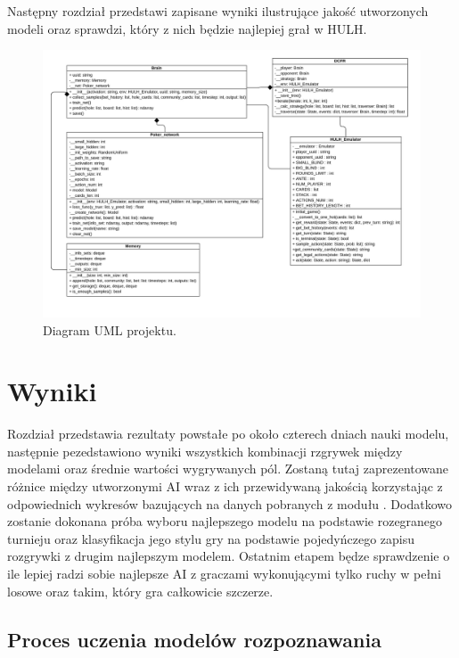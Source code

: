 \documentclass[12pt,oneside,a4paper]{report}
\begin{document}
Następny
rozdział przedstawi zapisane wyniki ilustrujące jakość utworzonych modeli oraz sprawdzi, który z
nich będzie najlepiej grał w HULH.



\begin{figure}[!ht]
  \centering
  \hspace*{-1cm}   
  \includegraphics[width=1.1\textwidth]{./img/uml.pdf}
  \caption{Diagram UML projektu.}
\end{figure}





\chapter{Wyniki}

Rozdział przedstawia rezultaty powstałe po około czterech dniach nauki modelu, następnie
pezedstawiono wyniki
wszystkich kombinacji rzgrywek między modelami oraz średnie wartości wygrywanych pól.
Zostaną tutaj zaprezentowane różnice między utworzonymi AI wraz z ich przewidywaną jakością
korzystając z odpowiednich wykresów bazujących na danych pobranych z modułu . 
Dodatkowo zostanie dokonana próba wyboru najlepszego modelu na podstawie
rozegranego turnieju oraz klasyfikacja jego stylu gry na
podstawie pojedyńczego zapisu rozgrywki z drugim najlepszym modelem.
Ostatnim etapem będze sprawdzenie o ile lepiej radzi sobie najlepsze AI z graczami wykonującymi
tylko ruchy w pełni losowe oraz takim, który gra całkowicie szczerze. 


\section{Proces uczenia modelów rozpoznawania}
\end{document}
